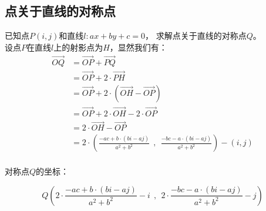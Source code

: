 \documentclass[UTF8]{ctexart}
\begin{document}
\newpage

\subsection{点关于直线的对称点}
    已知点$P(i,j)$和直线$l:ax+by+c=0$，
    求解点关于直线的对称点$Q$。\\[3mm]
    设点$P$在直线$l$上的射影点为$H$，显然我们有：
    \setcounter{equation}{0}
    \begin{align}
        \overrightarrow{OQ}
        &=\overrightarrow{OP}+\overrightarrow{PQ}\\[2mm]
        &=\overrightarrow{OP}+2\cdot\overrightarrow{PH}\\[2mm]
        &=\overrightarrow{OP}+2\cdot\left(\overrightarrow{OH}-\overrightarrow{OP}\right)\\[2mm]
        &=\overrightarrow{OP}+2\cdot\overrightarrow{OH}-2\cdot\overrightarrow{OP}\\[2mm]
        &=2\cdot\overrightarrow{OH}-\overrightarrow{OP}\\
        &=2\cdot\left(\frac{-ac+b\cdot(bi-aj)}{a^2+b^2}~~,~~\frac{-bc-a\cdot(bi-aj)}{a^2+b^2}\right)-(i,j)
    \end{align}\\
    对称点$Q$的坐标：\vspace{5pt}
    \begin{large}
        \begin{equation*}
            Q\left(2\cdot\frac{-ac+b\cdot(bi-aj)}{a^2+b^2}-i~~,~~2\cdot\frac{-bc-a\cdot(bi-aj)}{a^2+b^2}-j\right)
        \end{equation*}
    \end{large}

\newpage
\end{document}

